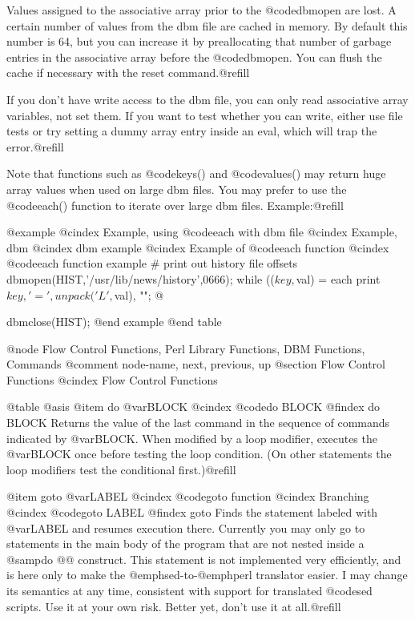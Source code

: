 {{{{{{{Values assigned to the associative array prior to the @code{dbmopen} are
lost.  A certain number of values from the dbm file are cached in memory.
By default this number is 64, but you can increase it by preallocating
that number of garbage entries in the associative array before the
@code{dbmopen}.  You can flush the cache if necessary with the reset
command.@refill

If you don't have write access to the dbm file, you can only read
associative array variables, not set them.  If you want to test whether
you can write, either use file tests or try setting a dummy array entry
inside an eval, which will trap the error.@refill

Note that functions such as @code{keys()} and @code{values()} may return
huge array values when used on large dbm files.  You may prefer to use
the @code{each()} function to iterate over large dbm files.  Example:@refill

@example
@cindex Example, using @code{each} with dbm file
@cindex Example, dbm
@cindex dbm example
@cindex Example of @code{each} function
@cindex @code{each} function example
# print out history file offsets
dbmopen(HIST,'/usr/lib/news/history',0666);
while (($key,$val) = each %
        print $key, ' = ', unpack('L',$val), "\n";
@}
dbmclose(HIST);
@end example
@end table

@node     Flow Control Functions, Perl Library Functions, DBM Functions, Commands
@comment  node-name,  next,  previous,  up
@section Flow Control Functions
@cindex Flow Control Functions

@table @asis
@item do @var{BLOCK}
@cindex @code{do BLOCK}
@findex do BLOCK
Returns the value of the last command in the sequence of commands
indicated by @var{BLOCK}.  When modified by a loop modifier, executes
the @var{BLOCK} once before testing the loop condition.  (On other
statements the loop modifiers test the conditional first.)@refill

@item goto @var{LABEL}
@cindex @code{goto} function
@cindex Branching
@cindex @code{goto LABEL}
@findex goto
Finds the statement labeled with @var{LABEL} and resumes execution
there.  Currently you may only go to statements in the main body of the
program that are not nested inside a @samp{do @{@}} construct.  This
statement is not implemented very efficiently, and is here only to make
the @emph{sed}-to-@emph{perl} translator easier.  I may change its
semantics at any time, consistent with support for translated @code{sed}
scripts.  Use it at your own risk.  Better yet, don't use it at all.@refill

}}}}}}

